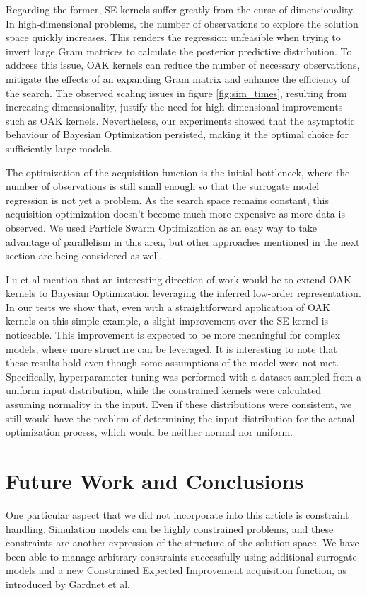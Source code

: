\documentclass{IOS-Book-Article}
\begin{document}
	Regarding the former, SE kernels suffer greatly from the curse of dimensionality. In high-dimensional problems, the number of observations to explore the solution space quickly increases. This renders the regression unfeasible when trying to invert large Gram matrices to calculate the posterior predictive distribution. To address this issue, OAK kernels can reduce the number of necessary observations, mitigate the effects of an expanding Gram matrix and enhance the efficiency of the search. The observed scaling issues in figure \ref{fig:sim_times}, resulting from increasing dimensionality, justify the need for high-dimensional improvements such as OAK kernels. Nevertheless, our experiments showed that the asymptotic behaviour of Bayesian Optimization persisted, making it the optimal choice for sufficiently large models.
	
	The optimization of the acquisition function is the initial bottleneck, where the number of observations is still small enough so that the surrogate model regression is not yet a problem. As the search space remains constant, this acquisition optimization doesn't become much more expensive as more data is observed. We used Particle Swarm Optimization as an easy way to take advantage of parallelism in this area, but other approaches mentioned in the next section are being considered as well\cite{acquisition-functions}.
	
	Lu et al\cite{gp-additive-orthogonal} mention that an interesting direction of work would be to extend OAK kernels to Bayesian Optimization leveraging the inferred low-order representation. In our tests we show that, even with a straightforward application of OAK kernels on this simple example, a slight improvement over the SE kernel is noticeable. This improvement is expected to be more meaningful for complex models, where more structure can be leveraged. It is interesting to note that these results hold even though some assumptions of the model were not met. Specifically, hyperparameter tuning was performed with a dataset sampled from a uniform input distribution, while the constrained kernels were calculated assuming normality in the input. Even if these distributions were consistent, we still would have the problem of determining the input distribution for the actual optimization process, which would be neither normal nor uniform.
	
	
	\section{Future Work and Conclusions}
	One particular aspect that we did not incorporate into this article is constraint handling. Simulation models can be highly constrained problems, and these constraints are another expression of the structure of the solution space. We have been able to manage arbitrary constraints successfully using additional surrogate models and a new Constrained Expected Improvement acquisition function, as introduced by Gardnet et al\cite{gp-constraints}.
	
\end{document}
